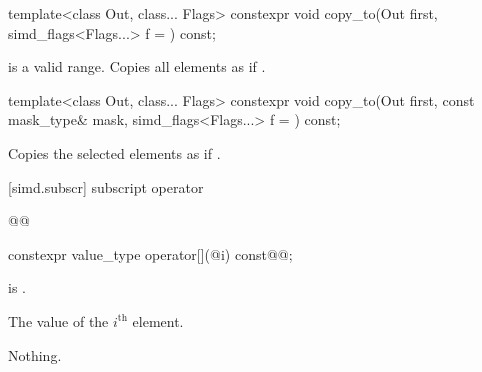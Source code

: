 \begin{itemdecl}
template<class Out, class... Flags>
  constexpr void copy_to(Out first, simd_flags<Flags...> f = {}) const;
\end{itemdecl}

\begin{itemdescr}
  \SimdStoreDescr
    { is a valid range.}
    {Copies all  elements as if  \foralli.}
\end{itemdescr}

\begin{itemdecl}
template<class Out, class... Flags>
  constexpr void copy_to(Out first, const mask_type& mask, simd_flags<Flags...> f = {}) const;
\end{itemdecl}

\begin{itemdescr}
  \SimdStoreDescr
    {\validMaskedRange}
    {Copies the selected elements as if  \forallmaskedi.}
\end{itemdescr}

[simd.subscr]{ subscript operator\texorpdfstring{}{s}}

\begin{wgBRem}
\begin{itemdecl}
@@
\end{itemdecl}

\begin{itemdescr}
  \pnum{}

  \pnum{}

  \pnum{}
\end{itemdescr}
\end{wgBRem}

\begin{itemdecl}
constexpr value_type operator[](@\simdsizetype@ i) const@\wgRem{\&}@;
\end{itemdecl}

\begin{itemdescr}
  \pnum\expects
   is .

  \pnum\returns
  The value of the $i^\text{th}$ element.

  \pnum\throws Nothing.
\end{itemdescr}

